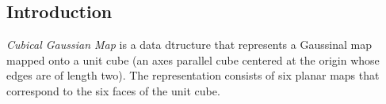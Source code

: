 \label{chap:cgm_ref}

\subsection*{Introduction}

{\em Cubical Gaussian Map} is a data dtructure that represents a Gaussinal map
mapped onto a unit cube (an axes parallel cube centered at the origin whose
edges are of length two). The representation consists of six planar maps that
correspond to the six faces of the unit cube.
